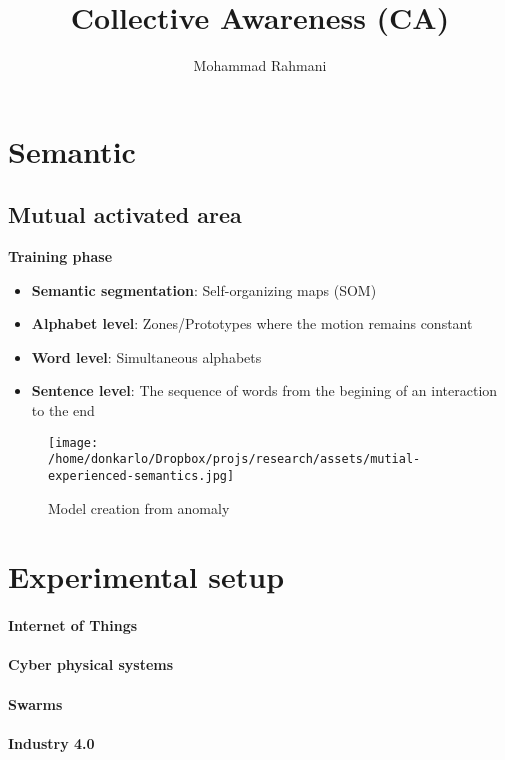 \documentclass{article}
\begin{document}
	
	\title{Collective Awareness (CA)}
	\author{Mohammad Rahmani}
	\date{}
	\maketitle
	\section{Semantic}
		\subsection{Mutual activated area}
			\textbf{Training phase}
			\begin{itemize}
				\item \textbf{Semantic segmentation}: Self-organizing maps (SOM)
				\item \textbf{Alphabet level}: Zones/Prototypes where the motion remains constant
				\item \textbf{Word level}: Simultaneous alphabets
				\item \textbf{Sentence level}: The sequence of words from the begining of an interaction to the end
			\end{itemize}
			\begin{figure}
				\texttt{[image: /home/donkarlo/Dropbox/projs/research/assets/mutial-experienced-semantics.jpg]}
				\caption{Model creation from anomaly}
			\end{figure}
		\subsection{}
	\section{Experimental setup}
		\paragraph{Internet of Things}
		\paragraph{Cyber physical systems}
		\paragraph{Swarms}
		\paragraph{Industry 4.0}
	
\end{document}
